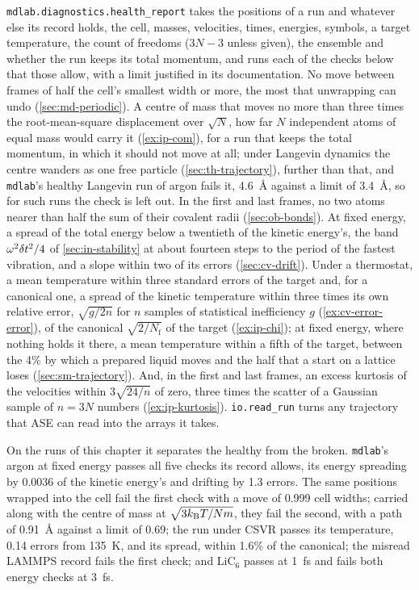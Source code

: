 \texttt{mdlab.diagnostics.health\_report} takes the positions of a run
and whatever else its record holds, the cell, masses, velocities, times,
energies, symbols, a target temperature, the count of freedoms ($3N - 3$
unless given), the ensemble and whether the run keeps its total momentum,
and runs each of the checks below that those allow, with a limit
justified in its documentation. No move between frames of half the
cell's smallest width or more, the most that unwrapping can undo
(\cref{sec:md-periodic}). A centre of mass that moves no more than three
times the root-mean-square displacement over $\sqrt N$, how far $N$
independent atoms of equal mass would carry it (\cref{ex:ip-com}), for a
run that keeps the total momentum, in which it should not move at all;
under Langevin dynamics the centre wanders as one free particle
(\cref{sec:th-trajectory}), further than that, and \texttt{mdlab}'s
healthy Langevin run of argon fails it, \SI{4.6}{\angstrom} against a
limit of \SI{3.4}{\angstrom}, so for such runs the check is left out. In
the first and last frames, no two atoms nearer than half the sum of their
covalent radii (\cref{sec:ob-bonds}). At fixed energy, a spread of the
total energy below a twentieth of the kinetic energy's, the band
$\omega^2\delta t^2/4$ of \cref{sec:in-stability} at about fourteen steps to
the period of the fastest vibration, and a slope within two of its errors
(\cref{sec:cv-drift}). Under a thermostat, a mean temperature within three
standard errors of the target and, for a canonical one, a spread of the
kinetic temperature within three times its own relative error,
$\sqrt{g/2n}$ for $n$ samples of statistical inefficiency $g$
(\cref{ex:cv-error-error}), of the canonical $\sqrt{2/N_{\mathrm f}}$ of
the target (\cref{ex:ip-chi}); at fixed energy, where nothing holds it
there, a mean temperature within a fifth of the target, between the 4\%
by which a prepared liquid moves and the half that a start on a lattice
loses (\cref{sec:sm-trajectory}). And, in the first and last frames, an
excess kurtosis of the velocities within $3\sqrt{24/n}$ of zero, three
times the scatter of a Gaussian sample of $n = 3N$ numbers
(\cref{ex:ip-kurtosis}). \texttt{io.read\_run} turns any trajectory that
ASE can read into the arrays it takes.

On the runs of this chapter it separates the healthy from the broken.
\texttt{mdlab}'s argon at fixed energy passes all five checks its record
allows, its energy spreading by 0.0036 of the kinetic energy's and
drifting by 1.3 errors. The same positions wrapped into the cell fail the
first check with a move of 0.999 cell widths; carried along with the
centre of mass at $\sqrt{3k_{\mathrm{B}} T/Nm}$, they fail the second, with a path
of \SI{0.91}{\angstrom} against a limit of \num{0.69}; the run under CSVR
passes its temperature, 0.14 errors from \SI{135}{\kelvin}, and its
spread, within 1.6\% of the canonical; the misread LAMMPS record fails the
first check; and LiC$_6$ passes at \SI{1}{\femto\second} and fails both
energy checks at \SI{3}{\femto\second}.

